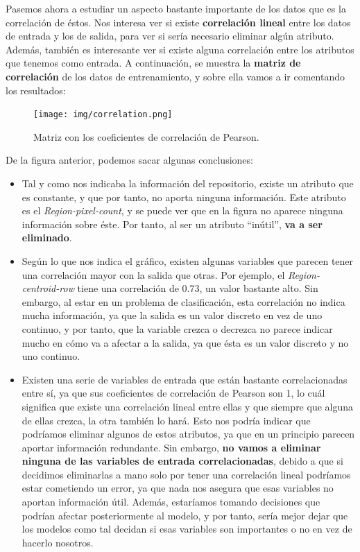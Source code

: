 \documentclass[11pt,a4paper]{article}
\begin{document}
Pasemos ahora a estudiar un aspecto bastante importante de los datos que es la correlación de éstos. Nos interesa ver si existe
\textbf{correlación lineal} entre los datos de entrada y los de salida, para ver si sería necesario eliminar algún atributo. Además, también es
interesante ver si existe alguna correlación entre los atributos que tenemos como entrada. A continuación, se muestra la \textbf{matriz de
correlación} de los datos de entrenamiento, y sobre ella vamos a ir comentando los resultados:

\begin{figure}[H]
    \centering
    \texttt{[image: img/correlation.png]}
    \caption{Matriz con los coeficientes de correlación de Pearson.}
    \label{fig:pearson}
\end{figure}

De la figura anterior, podemos sacar algunas conclusiones:

\begin{itemize}[label=\textbullet]
    \item Tal y como nos indicaba la información del repositorio, existe un atributo que es constante, y que por tanto, no aporta
    ninguna información. Este atributo es el \textit{Region-pixel-count}, y se puede ver que en la figura no aparece ninguna
    información sobre éste. Por tanto, al ser un atributo ``inútil'', \textbf{va a ser eliminado}.
    \item Según lo que nos indica el gráfico, existen algunas variables que parecen tener una correlación mayor con la salida que
    otras. Por ejemplo, el \textit{Region-centroid-row} tiene una correlación de 0.73, un valor bastante alto. Sin embargo, al estar
    en un problema de clasificación, esta correlación no indica mucha información, ya que la salida es un valor discreto en vez de
    uno continuo, y por tanto, que la variable crezca o decrezca no parece indicar mucho en cómo va a afectar a la salida, ya que ésta
    es un valor discreto y no uno continuo.
    \item Existen una serie de variables de entrada que están bastante correlacionadas entre sí, ya que sus coeficientes de correlación de
    Pearson son 1, lo cuál significa que existe una correlación lineal entre ellas y que siempre que alguna de ellas crezca, la otra también
    lo hará. Esto nos podría indicar que podríamos eliminar algunos de estos atributos, ya que en un principio parecen aportar información
    redundante. Sin embargo, \textbf{no vamos a eliminar ninguna de las variables de entrada correlacionadas}, debido a que si decidimos
    eliminarlas a mano solo por tener una correlación lineal podríamos estar cometiendo un error, ya que nada nos asegura que esas variables
    no aportan información útil. Además, estaríamos tomando decisiones que podrían afectar posteriormente al modelo, y por tanto, sería
    mejor dejar que los modelos como tal decidan si esas variables son importantes o no en vez de hacerlo nosotros.
\end{itemize}
\end{document}
